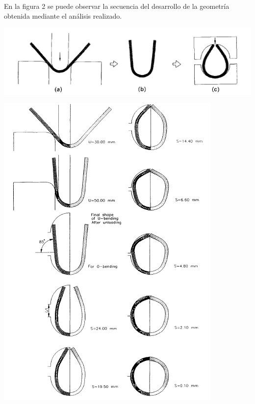 En la figura 2 se puede observar la secuencia del desarrollo de la geometría obtenida mediante el análisis 
realizado. 

\begin{center}
\includegraphics[scale=0.95]{src/ch1/uo-bending.png}
\end{center}

\begin{center}
\includegraphics[scale=0.8]{src/ch1/shape_sequence.png}
\end{center}